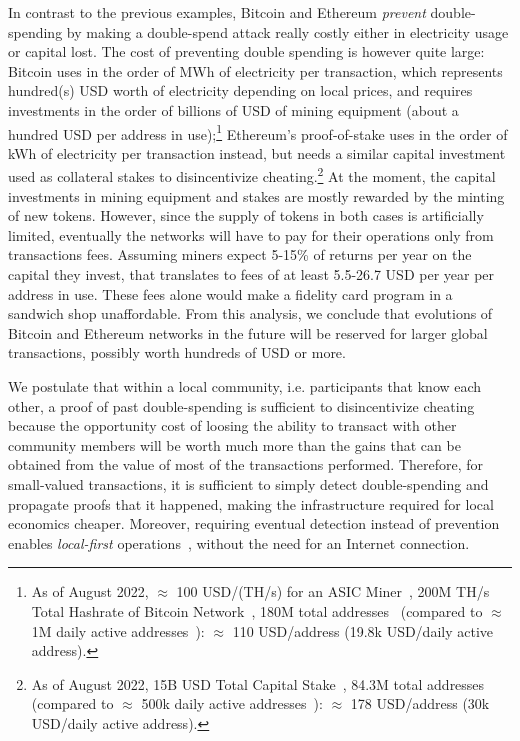 \documentclass[sigplan,screen,10pt]{acmart}
\begin{document}
In contrast to the previous examples, Bitcoin and Ethereum \textit{prevent} double-spending by making a double-spend attack really costly either in electricity usage or capital lost. The cost of preventing double spending is however quite large: Bitcoin uses in the order of MWh of electricity per transaction, which represents hundred(s) USD worth of electricity depending on local prices, and requires investments in the order of billions of USD of mining equipment (about a hundred USD per address in use);\footnote{As of August 2022, $\approx$ 100 USD/(TH/s) for an ASIC Miner~\cite{bitcoin-asic-mining}, 200M TH/s Total Hashrate of Bitcoin Network~\cite{total-hashrate}, 180M total addresses~\cite{bitcoin-stats} (compared to $\approx$ 1M daily active addresses~\cite{bitcoin-daily-active-addresses}): $\approx$ 110 USD/address (19.8k USD/daily active address).} Ethereum's proof-of-stake uses in the order of kWh of electricity per transaction instead, but needs a similar capital investment used as collateral stakes to disincentivize cheating.\footnote{As of August 2022, 15B USD Total Capital Stake~\cite{proof-of-stake}, 84.3M total addresses~\cite{ethereum-addresses} (compared to $\approx$ 500k daily active addresses~\cite{ethereum-daily-active-addresses}): $\approx$ 178 USD/address (30k USD/daily active address).} At the moment, the capital investments in mining equipment and stakes are mostly rewarded by the minting of new tokens. However, since the supply of tokens in both cases is artificially limited, eventually the networks will have to pay for their operations only from transactions fees. Assuming miners expect 5-15\% of returns per year on the capital they invest, that translates to fees of at least 5.5-26.7 USD per year per address in use. These fees alone would make a fidelity card program in a sandwich shop unaffordable. From this analysis, we conclude that evolutions of Bitcoin and Ethereum networks in the future will be reserved for larger global transactions, possibly worth hundreds of USD or more.

We postulate that within a local community, i.e. participants that know each other, a proof of past double-spending is sufficient to disincentivize cheating because the opportunity cost of loosing the ability to transact with other community members will be worth much more than the gains that can be obtained from the value of most of the transactions performed. Therefore, for small-valued transactions, it is sufficient to simply detect double-spending and propagate proofs that it happened, making the infrastructure required for local economics cheaper. Moreover, requiring eventual detection instead of prevention enables \textit{local-first} operations~\cite{kleppmann2019local-first-software}, without the need for an Internet connection.
\end{document}
